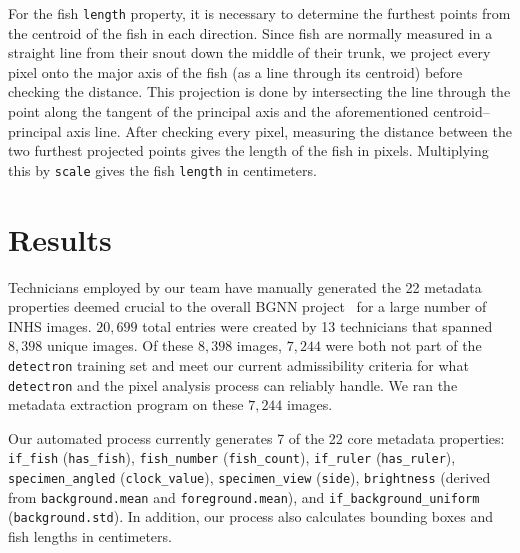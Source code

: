 \documentclass[screen,review]{acmart}
\begin{document}
For the fish \verb|length| property, it is necessary to determine the furthest points from the centroid of the fish in each direction. Since fish are normally measured in a straight line from their snout down the middle of their trunk, we project every pixel onto the major axis of the fish (as a line through its centroid) before checking the distance. This projection is done by intersecting the line through the point along the tangent of the principal axis and the aforementioned centroid--principal axis line. After checking every pixel, measuring the distance between the two furthest projected points gives the length of the fish in pixels. Multiplying this by \verb|scale| gives the fish \verb|length| in centimeters.

\section{Results}
Technicians employed by our team have manually generated the 22 metadata properties deemed crucial to the overall BGNN project~\cite{Leipzig2021.01.28.428644} for a large number of INHS images. \(20,699\) total entries were created by 13 technicians that spanned \(8,398\) unique images. Of these \(8,398\) images, \(7,244\) were both not part of the \verb|detectron| training set and meet our current admissibility criteria for what \verb|detectron| and the pixel analysis process can reliably handle. We ran the metadata extraction program on these \(7,244\) images.

Our automated process currently generates 7 of the 22 core metadata properties: \verb|if_fish| (\verb|has_fish|), \verb|fish_number| (\verb|fish_count|), \verb|if_ruler| (\verb|has_ruler|), \verb|specimen_angled| (\verb|clock_value|), \verb|specimen_view| (\verb|side|), \verb|brightness| (derived from \verb|background.mean| and \verb|foreground.mean|), and \verb|if_background_uniform| (\verb|background.std|). In addition, our process also calculates bounding boxes and fish lengths in centimeters.
\end{document}
